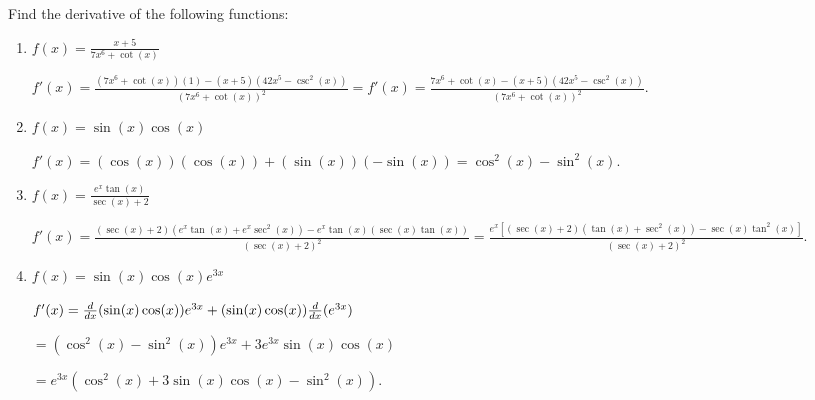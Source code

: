 \documentclass[nooutcomes]{ximera}
\begin{document}
\begin{problem}
Find the derivative of the following functions:

	\begin{enumerate}
	
	\item  $f(x) = \frac{x+5}{7x^6 + \cot(x)}$
			\begin{freeResponse}
			$f'(x) = \frac{(7x^6 + \cot(x))(1) - (x+5)(42x^5 - \csc^2(x))}{(7x^6 + \cot(x))^2}
			= f'(x) = \frac{7x^6 + \cot(x) - (x+5)(42x^5 - \csc^2(x))}{(7x^6 + \cot(x))^2}$.
			\end{freeResponse}
			
			
			
	\item  $f(x) = \sin(x) \cos(x)$
			\begin{freeResponse}
			$f'(x) = (\cos(x))(\cos(x)) + (\sin(x))(-\sin(x)) = \cos^2(x) - \sin^2(x)$.
			\end{freeResponse}
			
			
			
	\item  $f(x) = \frac{e^x \tan(x)}{\sec(x) + 2}$
			\begin{freeResponse}
			$f'(x) = \frac{(\sec(x)+2)(e^x \tan(x) + e^x \sec^2(x)) - e^x \tan(x) (\sec(x) \tan(x))}{(\sec(x) + 2)^2}
			= \frac{e^x[(\sec(x) + 2)(\tan(x) + \sec^2(x)) - \sec(x) \tan^2(x)]}{(\sec(x) + 2)^2}$.
			\end{freeResponse}
			
			
			
	\item  $f(x) = \sin(x) \cos(x) e^{3x}$
			\begin{freeResponse}
			$f'(x) = \frac{d}{dx}(\sin(x) \cos(x)) e^{3x} + (\sin(x) \cos(x)) \frac{d}{dx}(e^{3x})$
			
			$= (\cos^2(x) - \sin^2(x))e^{3x} + 3e^{3x} \sin(x) \cos(x)$
			
			$= e^{3x}(\cos^2(x) + 3\sin(x) \cos(x) - \sin^2(x))$.
			\end{freeResponse}
			
			
			
	\end{enumerate}
		
\end{problem}









\begin{problem}

		\begin{freeResponse}
		
		\end{freeResponse}
		
\end{problem}
\end{document}
